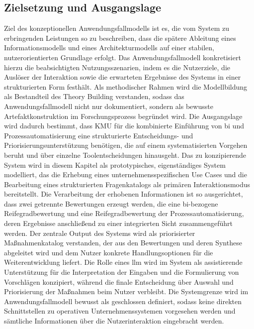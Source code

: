 \subsection{Zielsetzung und Ausgangslage}
Ziel des konzeptionellen Anwendungsfallmodells ist es, die vom System zu erbringenden Leistungen so zu beschreiben, dass die spätere Ableitung eines Informationsmodells und eines Architekturmodells auf einer stabilen, nutzerorientierten Grundlage erfolgt. \cite{jacobson2024_usecase3}
Das Anwendungsfallmodell konkretisiert hierzu die beabsichtigten Nutzungsszenarien, indem es die Nutzerziele, die Auslöser der Interaktion sowie die erwarteten Ergebnisse des Systems in einer strukturierten Form festhält. \cite{jacobson2024_usecase3}
Als methodischer Rahmen wird die Modellbildung als Bestandteil des Theory Building verstanden, sodass das Anwendungsfallmodell nicht nur dokumentiert, sondern als bewusste Artefaktkonstruktion im Forschungsprozess begründet wird. \cite{nunamaker1990}
Die Ausgangslage wird dadurch bestimmt, dass KMU für die kombinierte Einführung von \gls{bi} und Prozessautomatisierung eine strukturierte Entscheidungs- und Priorisierungsunterstützung benötigen, die auf einem systematisierten Vorgehen beruht und über einzelne Toolentscheidungen hinausgeht. \cite{norman_draper1986}
Das zu konzipierende System wird in diesem Kapitel als prototypisches, eigenständiges System modelliert, das die Erhebung eines unternehmensspezifischen Use Cases und die Bearbeitung eines strukturierten Fragenkatalogs als primären Interaktionsmodus bereitstellt. \cite{jacobson2024_usecase3}
Die Verarbeitung der erhobenen Informationen ist so ausgerichtet, dass zwei getrennte Bewertungen erzeugt werden, die eine \gls{bi}-bezogene Reifegradbewertung und eine Reifegradbewertung der Prozessautomatisierung, deren Ergebnisse anschließend zu einer integrierten Sicht zusammengeführt werden. \cite{nunamaker1990}
Der zentrale Output des Systems wird als priorisierter Maßnahmenkatalog verstanden, der aus den Bewertungen und deren Synthese abgeleitet wird und dem Nutzer konkrete Handlungsoptionen für die Weiterentwicklung liefert. \cite{jacobson2024_usecase3}
Die Rolle eines \gls{llm} wird im System als assistierende Unterstützung für die Interpretation der Eingaben und die Formulierung von Vorschlägen konzipiert, während die finale Entscheidung über Auswahl und Priorisierung der Maßnahmen beim Nutzer verbleibt. \cite{norman_draper1986}
Die Systemgrenze wird im Anwendungsfallmodell bewusst als geschlossen definiert, sodass keine direkten Schnittstellen zu operativen Unternehmenssystemen vorgesehen werden und sämtliche Informationen über die Nutzerinteraktion eingebracht werden. \cite{jacobson2024_usecase3}
